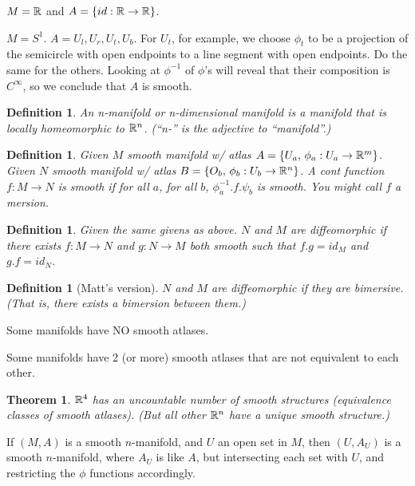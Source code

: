 \documentclass[11pt,leqno,oneside]{amsart}
\theoremstyle{mystyle} \newtheorem{thrm}[thm]{Theorem}
\theoremstyle{mystyle} \newtheorem{defi}[thm]{Definition}
\begin{document}
\begin{example}
	$M = {\mathbb R}$ and $A = \{ id: {\mathbb R} \to {\mathbb R} \}$.
\end{example}

\begin{example}
	$M = S^1$.  $A = {U_l, U_r, U_t, U_b}$.  For $U_t$, for example, we choose $\phi_t$ to be a projection of the semicircle with open endpoints to a line segment with open endpoints.  Do the same for the others.  Looking at $\phi^{-1}$ of $\phi$'s will reveal that their composition is $C^\infty$, so we conclude that $A$ is smooth.
\end{example}

\begin{defi}
	An \emph{n-}manifold or \emph{n-dimensional} manifold is a manifold that is locally homeomorphic to ${\mathbb R}^n$.  (``n-'' is the adjective to ``manifold''.)
\end{defi}


\begin{defi}
	Given $M$ smooth manifold w/ atlas $A = \{ U_a, \,  \phi_a : U_a \to {\mathbb R}^m \}$.
	Given $N$ smooth manifold w/ atlas $B = \{ O_b, \,  \phi_b : U_b \to {\mathbb R}^n \}$.
	A cont function $f : M \to N$ is \emph{smooth} if for all $a$, for all $b$, $\phi_a^{-1}.f.\psi_b$ is smooth.  You might call $f$ a \emph{mersion}.
\end{defi}
\begin{defi}
	Given the same givens as above.
	$N$ and $M$ are \emph{diffeomorphic} if there exists $f : M \to N$ and $g : N \to M$ both smooth such that $f.g = id_M$ and $g.f = id_N$.
\end{defi}
\begin{defi}[Matt's version]
	$N$ and $M$ are \emph{diffeomorphic} if they are bimersive.  (That is, there exists a bimersion between them.)
\end{defi}

\begin{rmk}
	Some manifolds have NO smooth atlases.

	Some manifolds have 2 (or more) smooth atlases that are not equivalent to each other.
\end{rmk}


\begin{thrm}
	${\mathbb R}^4$ has an uncountable number of smooth structures (equivalence classes of smooth atlases).  (But all other ${\mathbb R}^n$ have a unique smooth structure.)
\end{thrm}

\begin{rmk}
	If $(M,A)$ is a smooth $n$-manifold, and $U$ an open set in $M$, then $(U,A_U)$ is a smooth $n$-manifold, where $A_U$ is like $A$, but intersecting each set with $U$, and restricting the $\phi$ functions accordingly.
\end{rmk}
\end{document}
